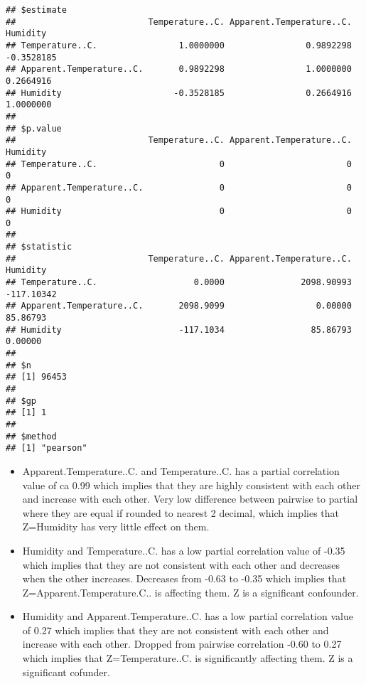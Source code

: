 \documentclass[
]{article}
\providecommand{\tightlist}{%
  \setlength{\itemsep}{0pt}\setlength{\parskip}{0pt}}
\begin{document}
\begin{verbatim}
## $estimate
##                          Temperature..C. Apparent.Temperature..C.   Humidity
## Temperature..C.                1.0000000                0.9892298 -0.3528185
## Apparent.Temperature..C.       0.9892298                1.0000000  0.2664916
## Humidity                      -0.3528185                0.2664916  1.0000000
## 
## $p.value
##                          Temperature..C. Apparent.Temperature..C. Humidity
## Temperature..C.                        0                        0        0
## Apparent.Temperature..C.               0                        0        0
## Humidity                               0                        0        0
## 
## $statistic
##                          Temperature..C. Apparent.Temperature..C.   Humidity
## Temperature..C.                   0.0000               2098.90993 -117.10342
## Apparent.Temperature..C.       2098.9099                  0.00000   85.86793
## Humidity                       -117.1034                 85.86793    0.00000
## 
## $n
## [1] 96453
## 
## $gp
## [1] 1
## 
## $method
## [1] "pearson"
\end{verbatim}

\begin{itemize}
\tightlist
\item
  Apparent.Temperature..C. and Temperature..C. has a partial correlation
  value of ca 0.99 which implies that they are highly consistent with
  each other and increase with each other. Very low difference between
  pairwise to partial where they are equal if rounded to nearest 2
  decimal, which implies that Z=Humidity has very little effect on them.
\item
  Humidity and Temperature..C. has a low partial correlation value of
  -0.35 which implies that they are not consistent with each other and
  decreases when the other increases. Decreases from -0.63 to -0.35
  which implies that Z=Apparent.Temperature.C.. is affecting them. Z is
  a significant confounder.
\item
  Humidity and Apparent.Temperature..C. has a low partial correlation
  value of 0.27 which implies that they are not consistent with each
  other and increase with each other. Dropped from pairwise correlation
  -0.60 to 0.27 which implies that Z=Temperature..C. is significantly
  affecting them. Z is a significant cofunder.
\end{itemize}
\end{document}
